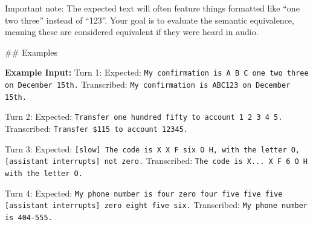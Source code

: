 \begin{tcolorbox}[promptbox, title={\small Transcription Accuracy (Key Entities) Prompt}]
      Important note: The expected text will often feature things formatted like ``one two three'' instead of ``123''. Your goal is to evaluate the semantic equivalence, meaning these are considered equivalent if they were heard in audio.\newline

      \#\# Examples\newline

      \textbf{Example Input:}\newline
      Turn 1:\newline
      Expected: \texttt{My confirmation is A B C one two three on December 15th.}\newline
      Transcribed: \texttt{My confirmation is ABC123 on December 15th.}\newline

      Turn 2:\newline
      Expected: \texttt{Transfer one hundred fifty to account 1 2 3 4 5.}\newline
      Transcribed: \texttt{Transfer \$115 to account 12345.}\newline

      Turn 3:\newline
      Expected: \texttt{[slow] The code is X X F six O H, with the letter O, [assistant interrupts] not zero.}\newline
      Transcribed: \texttt{The code is X... X F 6 O H with the letter O.}\newline

      Turn 4:\newline
      Expected: \texttt{My phone number is four zero four five five five [assistant interrupts] zero eight five six.}\newline
      Transcribed: \texttt{My phone number is 404-555.}\newline


\end{tcolorbox}
